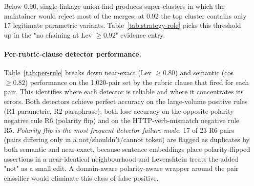 \documentclass[11pt,a4paper]{article}
\begin{document}
Below 0.90, single-linkage union-find produces super-clusters in which
the maintainer would reject most of the merges; at 0.92 the top
cluster contains only 17 legitimate parametric variants. Table~\ref{tab:strategy-role}
picks this threshold up in the "no chaining at Lev $\geq 0.92$"
evidence entry.

\paragraph{Per-rubric-clause detector performance.}
Table~\ref{tab:per-rule} breaks down near-exact (Lev $\geq 0.80$)
and semantic (cos $\geq 0.82$) performance on the 1{,}020-pair set
by the rubric clause that fired for each pair. This identifies
where each detector is reliable and where it concentrates its
errors. Both detectors achieve perfect accuracy on the large-volume
positive rules (R1 parametric, R2 paraphrase); both lose accuracy
on the opposite-polarity negative rule R6 (polarity flip) and on
the HTTP-verb-mismatch negative rule R5. \emph{Polarity flip is
the most frequent detector failure mode}: 17 of 23 R6 pairs
(pairs differing only in a not/shouldn't/cannot token) are flagged
as duplicates by both semantic and near-exact, because sentence
embeddings place polarity-flipped assertions in a near-identical
neighbourhood and Levenshtein treats the added "not" as a small
edit. A domain-aware polarity-aware wrapper around the pair
classifier would eliminate this class of false positive.
\end{document}
